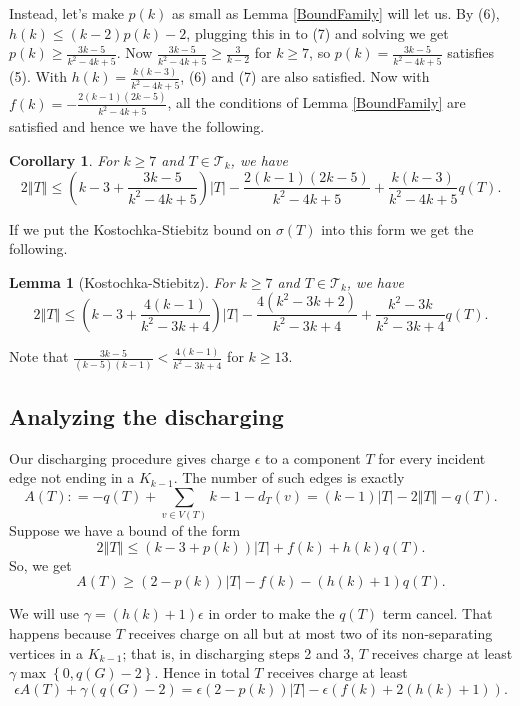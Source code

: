 \documentclass[12pt]{article}
\theoremstyle{plain}
\newtheorem{lem}[thm]{Lemma}
\newtheorem{cor}[thm]{Corollary}
\theoremstyle{definition}
\theoremstyle{remark}
\newcommand{\fancy}[1]{\mathcal{#1}}
\newcommand{\T}{\fancy{T}}
\newcommand{\set}[1]{\left\{ #1 \right\}}
\newcommand{\card}[1]{\left|#1\right|}
\newcommand{\size}[1]{\left\Vert#1\right\Vert}
\newcommand{\parens}[1]{\left( #1 \right)}
\newcommand{\DefinedAs}{\mathrel{\mathop:}=}
\begin{document}
Instead, let's make $p(k)$ as small as Lemma \ref{BoundFamily} will let us. By (6), $h(k) \le (k-2)p(k) - 2$, plugging this in to (7) and solving we get $p(k) \ge \frac{3k-5}{k^2 - 4k + 5}$.  Now $\frac{3k-5}{k^2 - 4k + 5} \ge \frac{3}{k-2}$ for $k \ge 7$, so $p(k) = \frac{3k-5}{k^2 - 4k + 5}$ satisfies (5).  With $h(k) = \frac{k(k-3)}{k^2 - 4k + 5}$, (6) and (7) are also satisfied. Now with $f(k) = -\frac{2(k-1)(2k-5)}{k^2 - 4k + 5}$, all the conditions of Lemma \ref{BoundFamily} are satisfied and hence we have the following.

\begin{cor}\label{SmallP}
	For $k \ge 7$ and $T \in \T_k$, we have
	\[2\size{T} \le \parens{k-3 + \frac{3k-5}{k^2 - 4k + 5}}\card{T} - \frac{2(k-1)(2k-5)}{k^2 - 4k + 5} + \frac{k(k-3)}{k^2 - 4k + 5}q(T).\]
\end{cor}

If we put the Kostochka-Stiebitz bound on $\sigma(T)$ into this form we get the following.

\begin{lem}[Kostochka-Stiebitz]
		For $k \ge 7$ and $T \in \T_k$, we have
		\[2\size{T} \le \parens{k-3 + \frac{4(k-1)}{k^2 - 3k + 4}}\card{T} - \frac{4(k^2-3k+2)}{k^2-3k+4} + \frac{k^2 - 3k}{k^2-3k+4}q(T).\]
\end{lem}

Note that $\frac{3k-5}{(k-5)(k-1)} < \frac{4(k-1)}{k^2 - 3k + 4}$ for $k \ge 13$.

\subsection{Analyzing the discharging}
Our discharging procedure gives charge $\epsilon$ to a component $T$ for every incident edge not ending in a $K_{k-1}$.  The number of such edges is exactly
\[A(T) \DefinedAs -q(T) + \sum_{v \in V(T)} k-1 - d_T(v) = (k-1)\card{T} - 2\size{T} - q(T).\]
Suppose we have a bound of the form
\[2\size{T} \le (k-3 + p(k))\card{T} + f(k) + h(k)q(T).\]
So, we get
\[A(T) \ge (2-p(k))\card{T} - f(k) - (h(k) + 1)q(T).\]

We will use $\gamma = (h(k) + 1)\epsilon$ in order to make the $q(T)$ term cancel.  That happens because $T$ receives charge on all but at most two of its non-separating vertices in a $K_{k-1}$; that is, in discharging steps 2 and 3, $T$ receives charge at least $\gamma\max\set{0, q(G) - 2}$.   Hence in total $T$ receives charge at least
\[\epsilon A(T) + \gamma(q(G) - 2) = \epsilon\parens{2-p(k)}\card{T} - \epsilon \parens{f(k) + 2(h(k) + 1)}.\]
\end{document}
